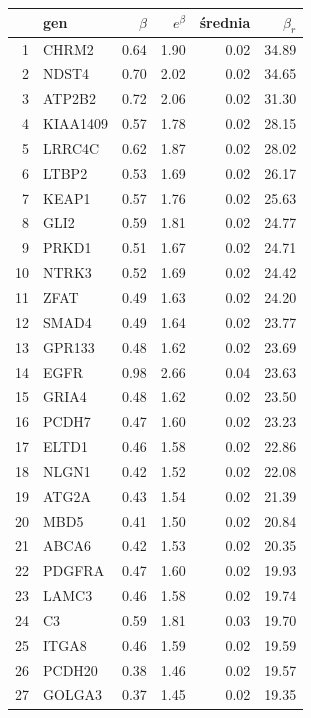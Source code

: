 \begin{table}[ht]
\centering

\begin{tabular}{rlrrrr}
  \toprule
 & gen & $\beta$ & $e^{\beta}$  & średnia & $\beta_{r}$ \\ 
  \toprule
1 & CHRM2 & 0.64 & 1.90 & 0.02 & 34.89 \\ 
  2 & NDST4 & 0.70 & 2.02 & 0.02 & 34.65 \\ 
  3 & ATP2B2 & 0.72 & 2.06 & 0.02 & 31.30 \\ 
  4 & KIAA1409 & 0.57 & 1.78 & 0.02 & 28.15 \\ 
  5 & LRRC4C & 0.62 & 1.87 & 0.02 & 28.02 \\ 
  6 & LTBP2 & 0.53 & 1.69 & 0.02 & 26.17 \\ 
  7 & KEAP1 & 0.57 & 1.76 & 0.02 & 25.63 \\ 
  8 & GLI2 & 0.59 & 1.81 & 0.02 & 24.77 \\ 
  9 & PRKD1 & 0.51 & 1.67 & 0.02 & 24.71 \\ 
  10 & NTRK3 & 0.52 & 1.69 & 0.02 & 24.42 \\ 
  11 & ZFAT & 0.49 & 1.63 & 0.02 & 24.20 \\ 
  12 & SMAD4 & 0.49 & 1.64 & 0.02 & 23.77 \\ 
  13 & GPR133 & 0.48 & 1.62 & 0.02 & 23.69 \\ 
  14 & EGFR & 0.98 & 2.66 & 0.04 & 23.63 \\ 
  15 & GRIA4 & 0.48 & 1.62 & 0.02 & 23.50 \\ 
  16 & PCDH7 & 0.47 & 1.60 & 0.02 & 23.23 \\ 
  17 & ELTD1 & 0.46 & 1.58 & 0.02 & 22.86 \\ 
  18 & NLGN1 & 0.42 & 1.52 & 0.02 & 22.08 \\ 
  19 & ATG2A & 0.43 & 1.54 & 0.02 & 21.39 \\ 
  20 & MBD5 & 0.41 & 1.50 & 0.02 & 20.84 \\ 
  21 & ABCA6 & 0.42 & 1.53 & 0.02 & 20.35 \\ 
  22 & PDGFRA & 0.47 & 1.60 & 0.02 & 19.93 \\ 
  23 & LAMC3 & 0.46 & 1.58 & 0.02 & 19.74 \\ 
  24 & C3 & 0.59 & 1.81 & 0.03 & 19.70 \\ 
  25 & ITGA8 & 0.46 & 1.59 & 0.02 & 19.59 \\ 
  26 & PCDH20 & 0.38 & 1.46 & 0.02 & 19.57 \\ 
  27 & GOLGA3 & 0.37 & 1.45 & 0.02 & 19.35 \\ 

\end{tabular}
\end{table}
